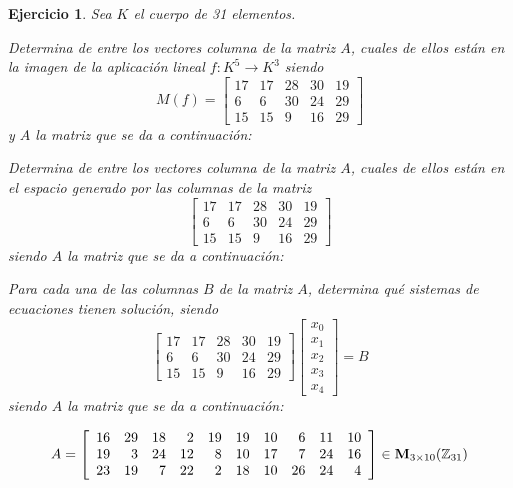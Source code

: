 \documentclass[12pt]{amsart}
\newtheorem{ejer}{Ejercicio}
\begin{document}
\begin{ejer} Sea $K$ el cuerpo de 31 elementos.
\newline
\noindent\begin{minipage}{\textwidth}
\begin{tcolorbox}[colback = green!20!white,title=Versión Núcleo]
Determina de entre los vectores columna de la matriz $A$, cuales de ellos están en la imagen de la aplicación lineal $f:K^{5} \to K^{3}$ siendo  $$ M(f) = \left[\begin{array}{rrrrr}
17 & 17 & 28 & 30 & 19 \\
6 & 6 & 30 & 24 & 29 \\
15 & 15 & 9 & 16 & 29
\end{array}\right] $$ y $A$ la matriz que se da a continuación:\end{tcolorbox}
\end{minipage} \newline
\noindent\begin{minipage}{\textwidth}
\begin{tcolorbox}[colback = blue!20!white,title=Versión Anulador]
Determina de entre los vectores columna de la matriz $A$, cuales de ellos están en el espacio generado por las columnas de la matriz $$ \left[\begin{array}{rrrrr}
17 & 17 & 28 & 30 & 19 \\
6 & 6 & 30 & 24 & 29 \\
15 & 15 & 9 & 16 & 29
\end{array}\right] $$ siendo $A$ la matriz que se da a continuación:\end{tcolorbox}
\end{minipage} \newline
\noindent\begin{minipage}{\textwidth} 
\begin{tcolorbox}[colback = red!20!white,title=Versión Ecuaciones Implícitas]
Para cada una de las columnas $B$ de la matriz $A$, determina qué sistemas de ecuaciones tienen solución, siendo $$ \left[\begin{array}{rrrrr}
17 & 17 & 28 & 30 & 19 \\
6 & 6 & 30 & 24 & 29 \\
15 & 15 & 9 & 16 & 29
\end{array}\right] \left[\begin{array}{r}
x_{0} \\
x_{1} \\
x_{2} \\
x_{3} \\
x_{4}
\end{array}\right] = B$$ siendo $A$ la matriz que se da a continuación:
\end{tcolorbox}
\end{minipage}
\[ A = \left[\begin{array}{rrrrrrrrrr}
16 & 29 & 18 & 2 & 19 & 19 & 10 & 6 & 11 & 10 \\
19 & 3 & 24 & 12 & 8 & 10 & 17 & 7 & 24 & 16 \\
23 & 19 & 7 & 22 & 2 & 18 & 10 & 26 & 24 & 4
\end{array}\right] \in {\bf M}_{3\times 10}({\mathbb Z}_{31})\]
\end{ejer}
\end{document}
